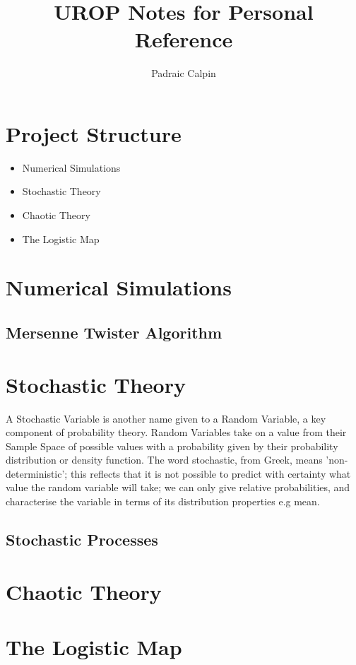 \documentclass[11pt,a4paper]{article}
\begin{document}
\title{UROP Notes for Personal Reference}
\author{Padraic Calpin}
\maketitle

\section*{Project Structure}
\begin{itemize}
	\item Numerical Simulations
	\item Stochastic Theory
	\item Chaotic Theory
	\item The Logistic Map
\end{itemize}
\section*{Numerical Simulations}
\subsection*{Mersenne Twister Algorithm}
\section*{Stochastic Theory}
A Stochastic Variable is another name given to a Random Variable, a key component of probability theory. Random Variables take on a value from their Sample Space of possible values with a probability given by their probability distribution or density function. The word stochastic, from Greek, means 'non-deterministic'; this reflects that it is not possible to predict with certainty what value the random variable will take; we can only give relative probabilities, and characterise the variable in terms of its distribution properties e.g mean. 
\subsection*{Stochastic Processes}

\section*{Chaotic Theory}
\section*{The Logistic Map}
\end{document}
